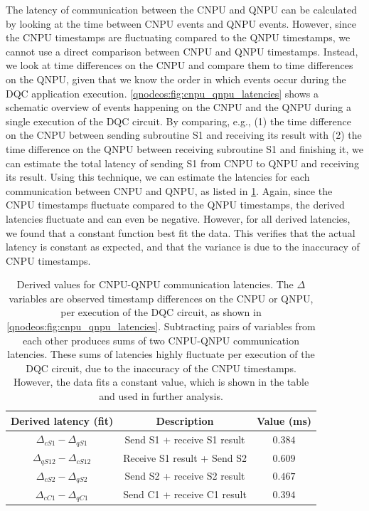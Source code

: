 The latency of communication between the \ac{CNPU} and \ac{QNPU} can be calculated by looking at the time between \ac{CNPU} events and \ac{QNPU} events. However, since the \ac{CNPU} timestamps are fluctuating compared to the \ac{QNPU} timestamps, we cannot use a direct comparison between \ac{CNPU} and QNPU timestamps. Instead, we look at time differences on the \ac{CNPU} and compare them to time differences on the QNPU, given that we know the order in which events occur during the DQC application execution. \cref{qnodeos:fig:cnpu_qnpu_latencies} shows a schematic overview of events happening on the \ac{CNPU} and the \ac{QNPU} during a single execution of the \ac{DQC} circuit. By comparing, e.g., (1) the time difference on the \ac{CNPU} between sending subroutine S1 and receiving its result with (2) the time difference on the \ac{QNPU} between receiving subroutine S1 and finishing it, we can estimate the total latency of sending S1 from \ac{CNPU} to \ac{QNPU} and receiving its result. Using this technique, we can estimate the latencies for each communication between \ac{CNPU} and \ac{QNPU}, as listed in \cref{tab:delta_diffs}. Again, since the \ac{CNPU} timestamps fluctuate compared to the \ac{QNPU} timestamps, the derived latencies fluctuate and can even be negative. However, for all derived latencies, we found that a constant function best fit the data. This verifies that the actual latency is constant as expected, and that the variance is due to the inaccuracy of \ac{CNPU} timestamps.

\begin{table}
    \centering
    \begin{tabular}{|c|c|c|}
    \hline
    \textbf{Derived latency (fit)} & \textbf{Description} & \textbf{Value (ms)} \\ 
    \hline
    $\Delta_{cS1} - \Delta_{qS1}$   & Send S1 + receive S1 result  & $0.384$ \\
    $\Delta_{qS12} - \Delta_{cS12}$ & Receive S1 result + Send S2  & $0.609$ \\
    $\Delta_{cS2} - \Delta_{qS2}$   & Send S2 + receive S2 result  & $0.467$ \\
    $\Delta_{cC1} - \Delta_{qC1}$   & Send C1 + receive C1 result  & $0.394$ \\
    \hline
    \end{tabular}
    \caption{Derived values for \ac{CNPU}-\ac{QNPU} communication latencies. The $\Delta$ variables are observed timestamp differences on the \ac{CNPU} or \ac{QNPU}, per execution of the \ac{DQC} circuit, as shown in \cref{qnodeos:fig:cnpu_qnpu_latencies}. Subtracting pairs of variables from each other produces sums of two \ac{CNPU}-\ac{QNPU} communication latencies. These sums of latencies highly fluctuate per execution of the \ac{DQC} circuit, due to the inaccuracy of the \ac{CNPU} timestamps. However, the data fits a constant value, which is shown in the table and used in further analysis.}
    \label{tab:delta_diffs}
\end{table}


